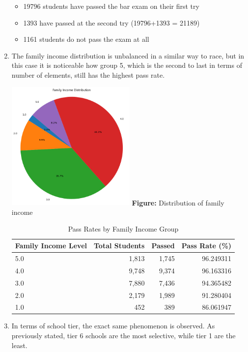 \documentclass{article}
\begin{document}
\begin{enumerate}
    \begin{itemize}
        \item 19796 students have passed the bar exam on their first try
        \item 1393 have passed at the second try (19796+1393 = 21189)
        \item 1161 students do not pass the exam at all
    \end{itemize}
    \item The family income distribution is unbalanced in a similar way to race, but in this case it is noticeable how group 5, which is the second to last in terms of number of elements, still has the highest pass rate. 
    \noindent
    \begin{center}
      \includegraphics[width=0.5\textwidth]{family income distribution.png}
      \vspace{0.5em}
      \textbf{Figure:} Distribution of family income
    \end{center}
    \begin{table}[h!]
    \centering
    \caption{Pass Rates by Family Income Group}
    \begin{tabular}{lrrr}
    \toprule
    Family Income Level & Total Students & Passed & Pass Rate (\%) \\
    \midrule
    5.0 & 1,813 & 1,745 & 96.249311 \\
    4.0 & 9,748 & 9,374 & 96.163316 \\
    3.0 & 7,880 & 7,436 & 94.365482 \\
    2.0 & 2,179 & 1,989 & 91.280404 \\
    1.0 & 452   & 389   & 86.061947 \\
    \bottomrule
    \end{tabular}
    \label{tab:pass_rates_income}
    \end{table}
    \item In terms of school tier, the exact same phenomenon is observed. As previously stated, tier 6 schools are the most selective, while tier 1 are the least. 

\end{enumerate}
\end{document}
